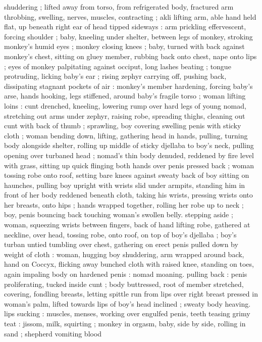 shuddering ; lifted away from torso, from refrigerated body, fractured
arm throbbing, swelling, nerves, muscles, contracting ; akli lifting
arm, able hand held flat, up beneath right ear of head tipped
sideways : arm prickling effervescent, forcing shoulder ; baby,
kneeling under shelter, between legs of monkey, stroking monkey's
humid eyes ; monkey closing knees ; baby, turned with back against
monkey's chest, sitting on gluey member, rubbing back onto chest,
nape onto lips ; eyes of monkey palpitating against occiput, long
lashes beating ; tongue protruding, licking baby’s ear ; rising zephyr
carrying off, pushing back, dissipating stagnant pockets of air :
monkey's member hardening, forcing baby's arse, hands hooking,
legs stiffened, around baby’s fragile torso ; woman lifting loins : cunt
drenched, kneeling, lowering rump over hard legs of young nomad,
stretching out arms under zephyr, raising robe, spreading thighs,
cleaning out cunt with back of thumb ; sprawling, boy covering
swelling penis with sticky cloth ; woman bending down, lifting,
gathering head in hands, pulling, turning body alongside shelter,
rolling up middle of sticky djellaba to boy's neck, pulling opening
over turbaned head ; nomad’s thin body denuded, reddened by fire
level with grass, sitting up quick flinging both hands over penis
pressed back ; woman tossing robe onto roof, setting bare knees
against sweaty back of boy sitting on haunches, pulling boy upright
with wrists slid under armpits, standing him in front of her body
reddened beneath cloth, taking his wrists, pressing wrists onto her
breasts, onto hips ; hands wrapped together, rolling her robe up to
neck ; boy, penis bouncing back touching woman's swollen belly.
stepping aside ; woman, squeezing wrists between fingers, back of
hand lifting robe, gathered at neckline, over head, tossing robe, onto
roof, on top of boy's djellaba ; boy's turban untied tumbling over
chest, gathering on erect penis pulled down by weight of cloth :
woman, hugging boy shuddering, arm wrapped around back, hand on
Coccyx, flicking away bunched cloth with raised knee, standing on
toes, again impaling body on hardened penis : nomad moaning.
pulling back : penis proliferating, tucked inside cunt ; body
buttressed, root of member stretched, covering, fondling breasts,
letting spittle run from lips over right breast pressed in woman's
palm, lifted towards lips of boy's head inclined ; sweaty body
heaving. lips sucking : muscles, menses, working over engulfed
penis, teeth teasing grimy teat : jissom, milk, squirting ; monkey in
orgasm, baby, side by side, rolling in sand ; shepherd vomiting blood
